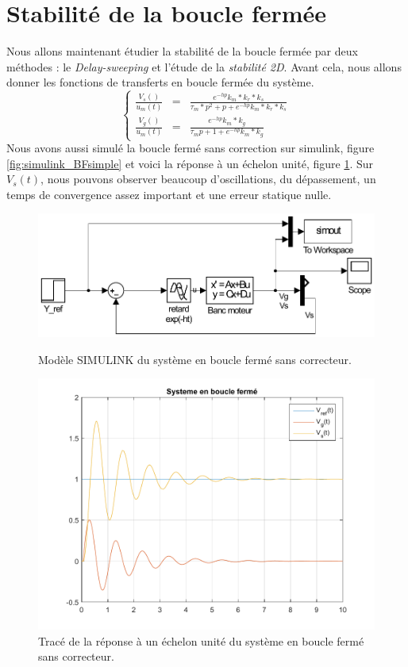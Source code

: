 	\section{Stabilité de la boucle fermée}
Nous allons maintenant étudier la stabilité de la boucle fermée par deux méthodes : le \emph{Delay-sweeping} et l'étude de la \emph{stabilité 2D}. Avant cela, nous allons donner les fonctions de transferts en boucle fermée du système. 
\begin{equation}
\left\lbrace
\begin{array}{lcl}
\frac{V_s()}{u_m(t)}	&=&	\frac{e^{-hp}k_m*k_r*k_s }{\tau_m *p^2 + p + e^{-hp}k_m*k_r*k_s }\\
\frac{V_g()}{u_m(t)}	&=&	\frac{e^{-hp}k_m*k_g }{\tau_m p + 1 + e^{-hp}k_m*k_g }
\end{array}
\right.
\end{equation}
Nous avons aussi simulé la boucle fermé sans correction sur simulink, figure \ref{fig:simulink_BFsimple} et voici la réponse à un échelon unité, figure \ref{fig:plot_BFsimple}. Sur $V_s(t)$, nous pouvons observer beaucoup d'oscillations, du dépassement, un temps de convergence assez important et une erreur statique nulle. 
\begin{figure}[!ht]
	\begin{minipage}{.5\textwidth}
		\centering
		\includegraphics[width=.8\textwidth]{./I/images/BFsimple_simulink.pdf}
		\caption{\label{fig:simulink_BFsimple}Modèle SIMULINK du système en boucle fermé sans correcteur.}
	\end{minipage}\hfill
	\begin{minipage}{.5\textwidth}
		\centering
		\includegraphics[width=.8\textwidth]{./I/images/BFsimple_plot.pdf}
		\caption{\label{fig:plot_BFsimple}Tracé de la réponse à un échelon unité du système en boucle fermé sans correcteur.}
	\end{minipage}
\end{figure}
